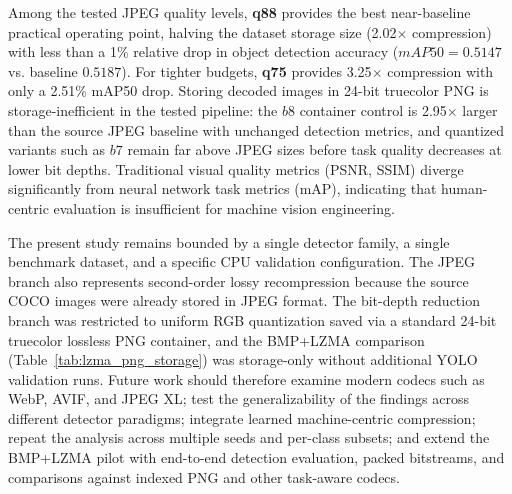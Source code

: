 \documentclass[12pt, a4paper]{article}
\begin{document}
Among the tested JPEG quality levels, \textbf{q88} provides the best near-baseline practical operating point, halving the dataset storage size (2.02$\times$ compression) with less than a 1\% relative drop in object detection accuracy ($mAP50 = 0.5147$ vs. baseline $0.5187$). For tighter budgets, \textbf{q75} provides 3.25$\times$ compression with only a 2.51\% mAP50 drop. Storing decoded images in 24-bit truecolor PNG is storage-inefficient in the tested pipeline: the $b8$ container control is 2.95$\times$ larger than the source JPEG baseline with unchanged detection metrics, and quantized variants such as $b7$ remain far above JPEG sizes before task quality decreases at lower bit depths. Traditional visual quality metrics (PSNR, SSIM) diverge significantly from neural network task metrics (mAP), indicating that human-centric evaluation is insufficient for machine vision engineering.

The present study remains bounded by a single detector family, a single benchmark dataset, and a specific CPU validation configuration. The JPEG branch also represents second-order lossy recompression because the source COCO images were already stored in JPEG format. The bit-depth reduction branch was restricted to uniform RGB quantization saved via a standard 24-bit truecolor lossless PNG container, and the BMP+LZMA comparison (Table~\ref{tab:lzma_png_storage}) was storage-only without additional YOLO validation runs. Future work should therefore examine modern codecs such as WebP, AVIF, and JPEG XL; test the generalizability of the findings across different detector paradigms; integrate learned machine-centric compression; repeat the analysis across multiple seeds and per-class subsets; and extend the BMP+LZMA pilot with end-to-end detection evaluation, packed bitstreams, and comparisons against indexed PNG and other task-aware codecs.
\end{document}
